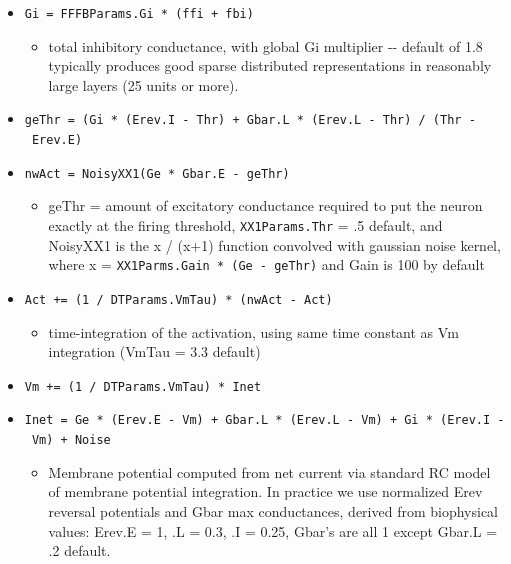\documentclass[11pt,twoside]{article}
\newif\myifpdf
\providecommand{\tightlist}{%
  \setlength{\itemsep}{.25in}\setlength{\parskip}{-.25in}}
\begin{document}
\begin{itemize}
  \item \texttt{Gi\ =\ FFFBParams.Gi\ *\ (ffi\ +\ fbi)}

    \begin{itemize}
	\tightlist
    \item
      total inhibitory conductance, with global Gi multiplier -\/-
      default of 1.8 typically produces good sparse distributed
      representations in reasonably large layers (25 units or more).
    \end{itemize}
	
  \item \texttt{geThr\ =\ (Gi\ *\ (Erev.I\ -\ Thr)\ +\ Gbar.L\ *\ (Erev.L\ -\ Thr)\ /\ (Thr\ -\ Erev.E)}

  \item \texttt{nwAct\ =\ NoisyXX1(Ge\ *\ Gbar.E\ -\ geThr)}

    \begin{itemize}
	\tightlist
    \item
      geThr = amount of excitatory conductance required to put the
      neuron exactly at the firing threshold, \texttt{XX1Params.Thr} =
      .5 default, and NoisyXX1 is the x / (x+1) function convolved with
      gaussian noise kernel, where x = \texttt{XX1Parms.Gain * (Ge - geThr)} and Gain is 100 by default
    \end{itemize}
	
  \item \texttt{Act\ +=\ (1\ /\ DTParams.VmTau)\ *\ (nwAct\ -\ Act)}

    \begin{itemize}
	\tightlist
    \item
      time-integration of the activation, using same time constant as Vm
      integration (VmTau = 3.3 default)
    \end{itemize}
	
  \item \texttt{Vm\ +=\ (1\ /\ DTParams.VmTau)\ *\ Inet}

  \item \texttt{Inet\ =\ Ge\ *\ (Erev.E\ -\ Vm)\ +\ Gbar.L\ *\ (Erev.L\ -\ Vm)\ +\ Gi\ *\ (Erev.I\ -\ Vm)\ +\ Noise}

    \begin{itemize}
	\tightlist
    \item
      Membrane potential computed from net current via standard RC model
      of membrane potential integration. In practice we use normalized
      Erev reversal potentials and Gbar max conductances, derived from
      biophysical values: Erev.E = 1, .L = 0.3, .I = 0.25, Gbar's are
      all 1 except Gbar.L = .2 default.
    \end{itemize}
\end{itemize}
\end{document}
